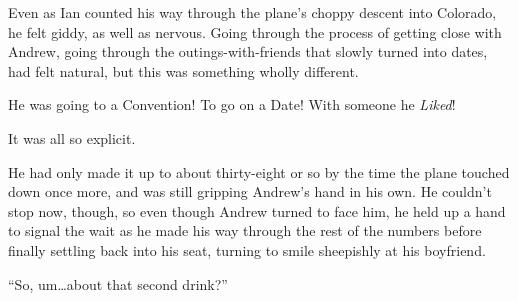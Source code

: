 Even as Ian counted his way through the plane's choppy descent into Colorado, he felt giddy, as well as nervous. Going through the process of getting close with Andrew, going through the outings-with-friends that slowly turned into dates, had felt natural, but this was something wholly different.

He was going to a Convention! To go on a Date! With someone he \textit{Liked}!

It was all so explicit.

He had only made it up to about thirty-eight or so by the time the plane touched down once more, and was still gripping Andrew's hand in his own. He couldn't stop now, though, so even though Andrew turned to face him, he held up a hand to signal the wait as he made his way through the rest of the numbers before finally settling back into his seat, turning to smile sheepishly at his boyfriend.

``So, um\ldots{}about that second drink?''
